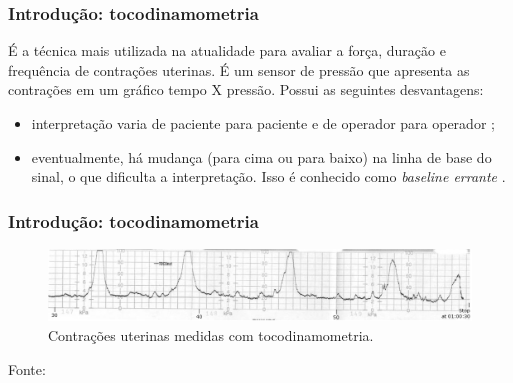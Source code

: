 \documentclass{beamer}
\begin{document}

\begin{frame}
	\frametitle{Introdu\c{c}\~ao: tocodinamometria}	
	
	É a técnica mais utilizada na atualidade para avaliar a força, duração e frequência de contrações uterinas. É um sensor de pressão que apresenta as contrações em um gráfico tempo X pressão. Possui as seguintes desvantagens:
	
	\begin{itemize}
		
		\item interpretação varia de paciente para paciente e de operador para operador  \cite{ref-bernardes};
		
		\item eventualmente, há mudança (para cima ou para baixo) na linha de base do sinal, o que dificulta a interpretação. Isso é conhecido como {\em baseline errante} \cite{ref-marques}.
		
	\end{itemize}
	
\end{frame}



\begin{frame}
	\frametitle{Introdu\c{c}\~ao: tocodinamometria}	

 \begin{figure}[H]
 	\caption{\label{toco} Contrações uterinas medidas com tocodinamometria.}
 	\begin{center}
 		\includegraphics[scale=0.40]{imagens/toco.jpg} 		
 	\end{center}
 \end{figure}
 
 Fonte: \cite{ref-islddatabase}
 
 
\end{frame}

\end{document}
